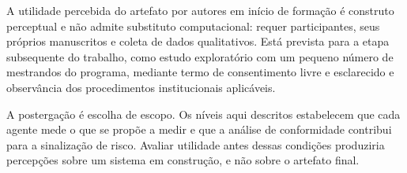 A utilidade percebida do artefato por autores em início de formação é construto perceptual e não admite substituto computacional: requer participantes, seus próprios manuscritos e coleta de dados qualitativos. Está prevista para a etapa subsequente do trabalho, como estudo exploratório com um pequeno número de mestrandos do programa, mediante termo de consentimento livre e esclarecido e observância dos procedimentos institucionais aplicáveis.

A postergação é escolha de escopo. Os níveis aqui descritos estabelecem que cada agente mede o que se propõe a medir e que a análise de conformidade contribui para a sinalização de risco. Avaliar utilidade antes dessas condições produziria percepções sobre um sistema em construção, e não sobre o artefato final. 







